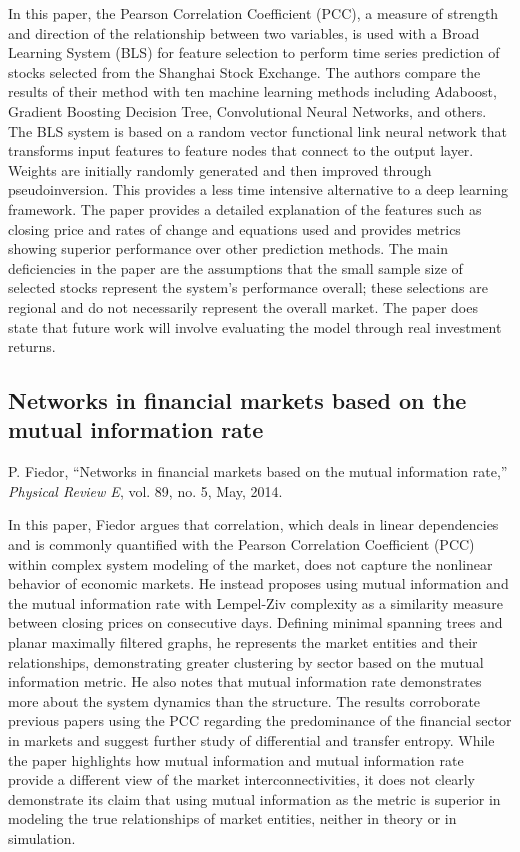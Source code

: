 \documentclass[12pt]{article}
\begin{document}
In this paper, the Pearson Correlation Coefficient (PCC), a measure of strength and direction of the relationship between two variables, is used with a Broad Learning System (BLS) for feature selection to perform time series prediction of stocks selected from the Shanghai Stock Exchange. The authors compare the results of their method with ten machine learning methods including Adaboost, Gradient Boosting Decision Tree, Convolutional Neural Networks, and others. The BLS system is based on a random vector functional link neural network that transforms input features to feature nodes that connect to the output layer. Weights are initially randomly generated and then improved through pseudoinversion. This provides a less time intensive alternative to a deep learning framework. The paper provides a detailed explanation of the features such as closing price and rates of change and equations used and provides metrics showing superior performance over other prediction methods. The main deficiencies in the paper are the assumptions that the small sample size of selected stocks represent the system's performance overall; these selections are regional and do not necessarily represent the overall market. The paper does state that future work will involve evaluating the model through real investment returns.


\subsection{Networks in financial markets based on the mutual information rate}
P. Fiedor, “Networks in financial markets based on the mutual information rate,” \textit{Physical Review E}, vol. 89, no. 5, May, 2014. %
\newline

In this paper, Fiedor argues that correlation, which deals in linear dependencies and is commonly quantified with the Pearson Correlation Coefficient (PCC) within complex system modeling of the market, does not capture the nonlinear behavior of economic markets. He instead proposes using mutual information and the mutual information rate with Lempel-Ziv complexity as a similarity measure between closing prices on consecutive days. Defining minimal spanning trees and planar maximally filtered graphs, he represents the market entities and their relationships, demonstrating greater clustering by sector based on the mutual information metric. He also notes that mutual information rate demonstrates more about the system dynamics than the structure. The results corroborate previous papers using the PCC regarding the predominance of the financial sector in markets and suggest further study of differential and transfer entropy. While the paper highlights how mutual information and mutual information rate provide a different view of the market interconnectivities, it does not clearly demonstrate its claim that using mutual information as the metric is superior in modeling the true relationships of market entities, neither in theory or in simulation.
\end{document}
